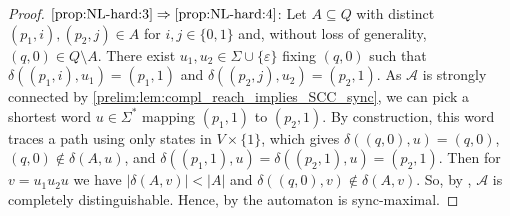 \begin{proof}
	$\ref{prop:NL-hard:3} \Rightarrow \ref{prop:NL-hard:4}$: Let $A \subseteq Q$ with distinct $(p_1, i), (p_2, j) \in A$ for $i,j\in \{0,1\}$ and, without loss of generality, $(q,0) \in Q \setminus A$.
	There exist %
	$u_1, u_2 \in \Sigma \cup \{\varepsilon\}$ fixing $(q,0)$
	such that $\delta((p_1, i), u_1) = (p_1, 1)$
	and $\delta((p_2, j), u_2) = (p_2, 1)$.
	As $\mathcal A$ is strongly connected by \cref{prelim:lem:compl_reach_implies_SCC_sync},
	we can pick a shortest word  $u \in \Sigma^*$ 
	mapping $(p_1, 1)$ to $(p_2, 1)$.	
	By construction, this word traces a path 
	using only states in $V \times \{1\}$, which gives
	$\delta((q, 0), u) = (q, 0)$,
	$(q, 0) \notin \delta(A, u)$,
	and $\delta((p_1, 1), u) = \delta((p_2, 1), u) = (p_2, 1)$.
	Then for $v = u_1 u_2 u$
	we have $|\delta(A, v)| < |A|$ and $\delta((q, 0),v) \notin \delta(A, v)$.
	So, by , 
	$\mathcal A$ is completely distinguishable.
	Hence, by 
	the automaton is sync-maximal.
	

\end{proof}
